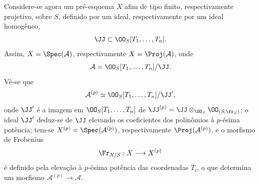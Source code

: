 Considere-se agora um pré-esquema $X$ afim de tipo finito, respectivamente projetivo, sobre $S$, definido por um ideal, respectivamente por um ideal homogêneo,
\[
\JJ\subset \OO_S[T_1,\ldots,T_n].
\]
Assim, $X=\Spec(\mathcal{A})$, respectivamente $X=\Proj(\mathcal{A})$, onde
\[
\mathcal{A}=\OO_S[T_1,\ldots,T_n]/\JJ.
\]
Vê-se que
\[
\mathcal{A}^{(p)}\simeq \OO_S[T_1,\ldots,T_n]/\JJ',
\]
onde $\JJ'$ é a imagem em $\OO_S[T_1,\ldots,T_n]$ de $\JJ^{(p)}=\JJ\otimes_{\OO_S}\OO_{(S,\fr_S)}$; o ideal $\JJ'$ deduz-se de $\JJ$ elevando os coeficientes dos polinômios à $p$-ésima potência; tem-se $X^{(p)}=\Spec(\mathcal{A}^{(p)})$, respectivamente $\Proj(\mathcal{A}^{(p)})$, e o morfismo de Frobenius
\[
\Fr_{X/S}:X\longrightarrow X^{(p)}
\]
é definido pela elevação à $p$-ésima potência das coordenadas $T_i$, o que determina um morfismo $\mathcal{A}^{(p)}\to\mathcal{A}$.
